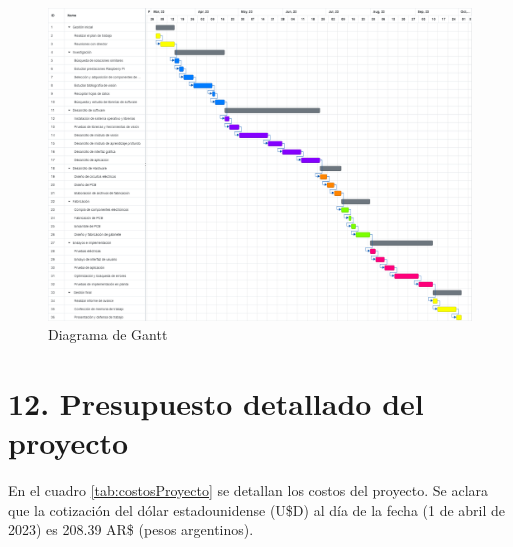 \documentclass[
11pt, %
codirector, %
]{charter}
\begin{document}
\begin{landscape}
\begin{figure}[htpb]
\centering 
\includegraphics[height=0.9\textheight]{./Figuras/gantt.png}
\caption{Diagrama de Gantt}
\label{fig:diagGantt}
\end{figure}
\end{landscape}

\section{12. Presupuesto detallado del proyecto}
\label{sec:presupuesto}

En el cuadro \ref{tab:costosProyecto} se detallan los costos del proyecto. Se aclara que la cotización del dólar estadounidense (U\$D) al día de la fecha (1 de abril de 2023) es 208.39 AR\$ (pesos argentinos).
\end{document}
